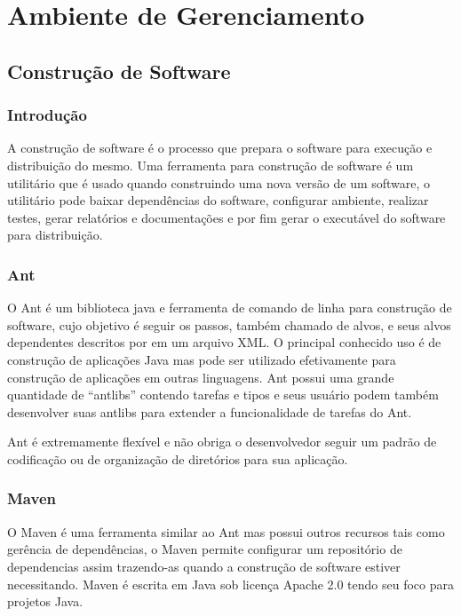 \documentclass[12pt,a4paper]{article}
\begin{document}
				

\clearpage		
\section{Ambiente de Gerenciamento}
	\subsection{Construção de Software}
		\subsubsection{Introdução}
		
			A construção de software é o processo que prepara o software para execução e distribuição do mesmo. Uma ferramenta
			para construção de software é um utilitário que é usado quando construindo uma nova versão de um software, o
			utilitário pode baixar dependências do software, configurar ambiente, realizar testes, gerar relatórios e
			documentações e por fim gerar o executável do software para distribuição.
			
		\subsubsection{Ant}
		
			O Ant é um biblioteca java e ferramenta de comando de linha para construção de software, cujo objetivo é seguir os
			passos, também chamado de alvos, e seus alvos dependentes descritos por em um arquivo XML. O principal conhecido uso
			é de construção de aplicações Java mas pode ser utilizado efetivamente para construção de aplicações em outras
			linguagens. Ant possui uma grande quantidade de ``antlibs'' contendo tarefas e tipos e seus usuário podem também
			desenvolver suas antlibs para extender a funcionalidade de tarefas do Ant.
			
			Ant é extremamente flexível e não obriga o desenvolvedor seguir um padrão de codificação ou de organização de
			diretórios para sua aplicação.
			
		\subsubsection{Maven}
		
			O Maven é uma ferramenta similar ao Ant mas possui outros recursos tais como gerência de dependências, o Maven
			permite configurar um repositório de dependencias assim trazendo-as quando a construção de software estiver necessitando.
			Maven é escrita em Java sob licença Apache 2.0 tendo seu foco para projetos Java.
			
\end{document}
